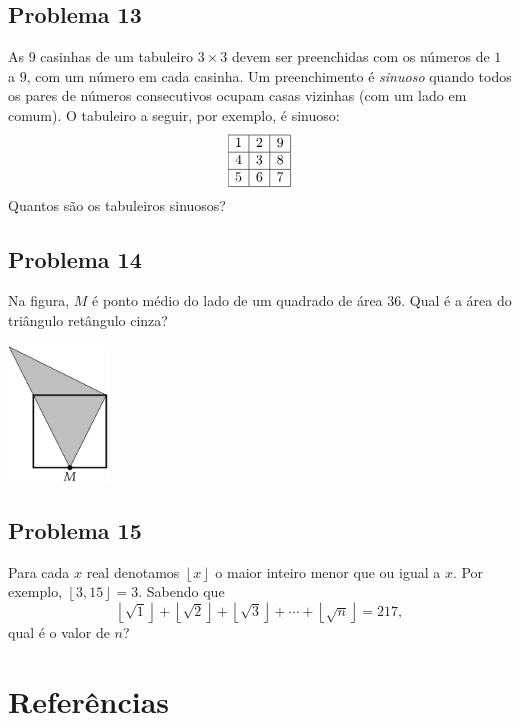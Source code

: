 \documentclass[12pt]{article}
\newcommand{\kb}[1]{\left\lfloor #1 \right\rfloor}
\begin{document}
\clearpage

\subsection{Problema 13}
\begin{tcolorbox}[statementbox]
As 9 casinhas de um tabuleiro $3 \times 3$ devem ser preenchidas com os números de $1$ a $9$, com um número em cada casinha. Um preenchimento é \emph{sinuoso} quando todos os pares de números consecutivos ocupam casas vizinhas (com um lado em comum). O tabuleiro a seguir, por exemplo, é sinuoso:
\[
  \begin{array}{|c|c|c|}\hline
    1 & 2 & 9 \\ \hline
    4 & 3 & 8 \\ \hline
    5 & 6 & 7 \\ \hline
  \end{array}
\]
Quantos são os tabuleiros sinuosos?
\end{tcolorbox}

\clearpage

\subsection{Problema 14}
\begin{tcolorbox}[statementbox]
Na figura, $M$ é ponto médio do lado de um quadrado de área $36$. Qual é a área do triângulo retângulo cinza? \\
\begin{center}
  \includegraphics[width=0.2\textwidth]{fifth.png}
\end{center}
\end{tcolorbox}

\clearpage

\subsection{Problema 15}
\begin{tcolorbox}[statementbox]
Para cada $x$ real denotamos $\kb{x}$ o maior inteiro menor que ou igual a $x$. Por exemplo, $\kb{3{,}15}=3$. Sabendo que
\[
  \kb{\sqrt{1}}+\kb{\sqrt{2}}+\kb{\sqrt{3}}+\cdots+\kb{\sqrt{n}}=217,
\]
qual é o valor de $n$? \\
\end{tcolorbox}

  \clearpage

  \section{\textsf{Referências}}
\end{document}
